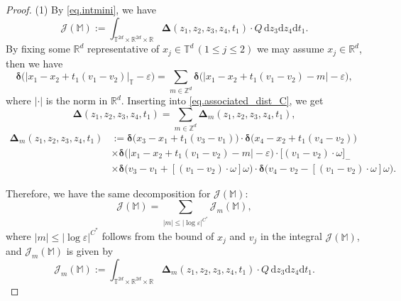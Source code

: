 \documentclass[10pt, reqno]{amsart}
\newcommand{\Mb}{\mathbb M}
\newcommand{\Rb}{\mathbb R}
\newcommand{\Tb}{\mathbb T}
\newcommand{\Zb}{\mathbb Z}
\newcommand {\Jc}{\mathcal J}
\theoremstyle{definition}
\theoremstyle{remark}
\numberwithin{equation}{section}
\begin{document}
\begin{proof} (1) By \eqref{eq.intmini}, we have
\begin{equation}\label{eq.proof_intmini_1_1}
    \Jc(\Mb):=\int_{\Tb^{2d}\times\Rb^{2d}\times\Rb}\boldsymbol{\Delta}(z_1,z_2,z_3,z_4,t_1)\cdot Q\,\mathrm{d}z_3\mathrm{d}z_4\mathrm{d}t_1.
\end{equation}
By fixing some $\Rb^d$ representative of $x_j\in\Tb^d\,(1\leq j\leq 2)$ we may assume $x_j\in\Rb^d$, then we have
\begin{equation}\label{eq.proof_intmini_1_2}
    \boldsymbol{\delta}\big(|x_1-x_2+t_1(v_1-v_2)|_\Tb-\varepsilon\big) = \sum_{m\in\Zb^d} \boldsymbol{\delta}\big(|x_1-x_2+t_1(v_1-v_2)-m|-\varepsilon\big),
\end{equation}
where $|\cdot|$ is the norm in $\Rb^d$. Inserting into \eqref{eq.associated_dist_C}, we get
\begin{equation}\label{eq.proof_intmini_1_3}
    \boldsymbol{\Delta}(z_1,z_2,z_3,z_4,t_1)=\sum_{m\in\Zb^d} \boldsymbol{\Delta}_{m}(z_1,z_2,z_3,z_4,t_1),
\end{equation} 
\begin{equation}\label{eq.proof_intmini_1_4}
\begin{aligned}
    \boldsymbol{\Delta}_m(z_1,z_2,z_3,z_4,t_1)&:=\boldsymbol{\delta}\big(x_3-x_1+t_1(v_3-v_1)\big)\cdot \boldsymbol{\delta}\big(x_4-x_2+t_1(v_4-v_2)\big)\\&\times \boldsymbol{\delta}\big(|x_1-x_2+t_1(v_1-v_2) - m|-\varepsilon\big)\cdot \big[(v_1-v_2)\cdot \omega\big]_-\\&\times\boldsymbol{\delta}\big(v_3-v_1+[(v_1-v_2)\cdot\omega]\omega\big)\cdot\boldsymbol{\delta}\big(v_4-v_2-[(v_1-v_2)\cdot\omega]\omega\big).
    \end{aligned}
\end{equation} 

Therefore, we have the same decomposition for $\Jc(\Mb)$:
\begin{equation}\label{eq.proof_intmini_1_5}
    \Jc(\Mb)=\sum_{|m|\leq |\log\varepsilon|^{C^*}}\Jc_m(\Mb),
\end{equation}
where $|m|\leq |\log\varepsilon|^{C^*}$ follows from the bound of $x_j$ and $v_j$ in the integral $\Jc(\Mb)$, and $\Jc_m(\Mb)$ is given by 
\begin{equation}\label{eq.proof_intmini_1_6}
    \Jc_m(\Mb):=\int_{\Tb^{2d}\times\Rb^{2d}\times\Rb}\boldsymbol{\Delta}_m(z_1,z_2,z_3,z_4,t_1)\cdot Q\,\mathrm{d}z_3\mathrm{d}z_4\mathrm{d}t_1.
\end{equation}


\end{proof}
\end{document}
